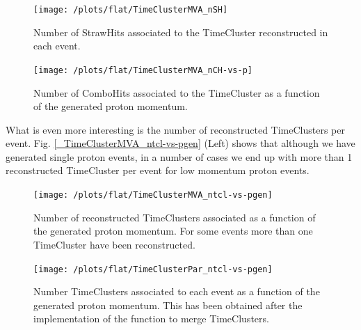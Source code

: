 \documentclass[12pt,a4paper,openright, oneside, titlepage]{book} %
\begin{document}
\begin{figure}[!htb]
    \centering
    \begin{minipage}{.49\textwidth}
		\centering
		\texttt{[image: /plots/flat/TimeClusterMVA\_nSH]}
		\caption[Number of StrawHits associated to a TimeCluster]
		{Number of StrawHits associated to the TimeCluster reconstructed in each event.}
\label{_TimeClusterMVA_nSH}
	\end{minipage}
	\hfill
    \begin{minipage}{0.49\textwidth}
    	\centering
    	\texttt{[image: /plots/flat/TimeClusterMVA\_nCH-vs-p]}
\caption[Number of ComboHit associated to a TimeCluster (per momentum)]{Number of ComboHits associated to the TimeCluster as a function of the generated proton momentum.}
\label{_flat_TimeClusterMVA_nCH-vs-p}
    \end{minipage}
\end{figure}
    	
\noindent What is even more interesting is the number of reconstructed TimeClusters per event.  
Fig. \ref{_TimeClusterMVA_ntcl-vs-pgen} (Left) shows that although we have generated single proton events, in a number of cases we end up with more than 1 reconstructed TimeCluster per event for low momentum proton events.

\begin{figure}[!htb]
    \centering
    \begin{minipage}{.49\textwidth}
		\centering
		\texttt{[image: /plots/flat/TimeClusterMVA\_ntcl-vs-pgen]}
		\caption[Number of TimeClusters per generated proton momentum]{Number of reconstructed TimeClusters associated 
		as a function of the generated proton momentum. 
		For some events more than one TimeCluster have been reconstructed.}
		\label{_TimeClusterMVA_ntcl-vs-pgen}
	\end{minipage}
	\hfill
    \begin{minipage}{0.49\textwidth}
    	\centering
    	\texttt{[image: /plots/flat/TimeClusterPar\_ntcl-vs-pgen]}
		\caption[Number of TimeClusters per generated momentum after merging]{Number TimeClusters associated to each event as a function of the generated proton momentum. 
		This has been obtained after the implementation of the function to merge TimeClusters.}
		\label{_TimeClusterPar_ntcl-vs-pgen}
	\end{minipage}
\end{figure}
\end{document}
